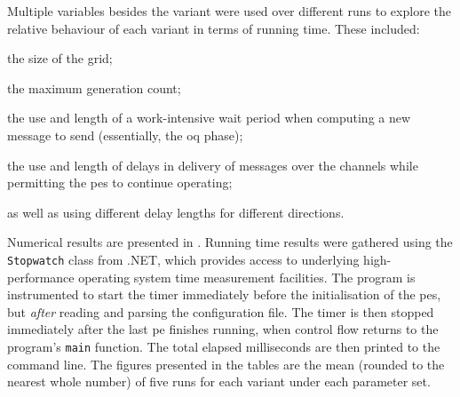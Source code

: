 
Multiple variables besides the variant were used over different runs to explore the relative behaviour of each variant in terms of running time.  These included:
\begin{inparablank}
\item the size of the grid;
\item the maximum generation count;
\item the use and length of a work-intensive wait period when computing a new message to send (essentially, the \gls{oq} phase);
\item the use and length of delays in delivery of messages over the channels while permitting the \glspl{pe} to continue operating;
\item as well as using different delay lengths for different directions.
\end{inparablank}



Numerical results are presented in .  Running time results were gathered using the \texttt{Stopwatch} class from .NET, which provides access to underlying high-performance operating system time measurement facilities.  The program is instrumented to start the timer immediately before the initialisation of the \glspl{pe}, but \emph{after} reading and parsing the configuration file.  The timer is then stopped immediately after the last \gls{pe} finishes running, when control flow returns to the program's \texttt{main} function.  The total elapsed milliseconds are then printed to the command line.  The figures presented in the tables are the mean (rounded to the nearest whole number) of five runs for each variant under each parameter set.

